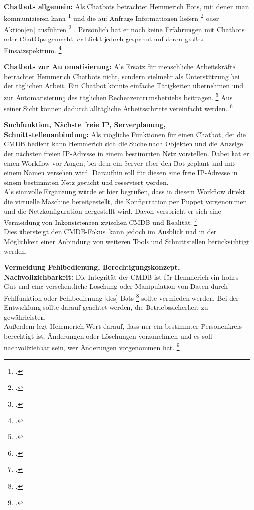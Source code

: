 \textbf{Chatbots allgemein: }Als Chatbots betrachtet Hemmerich Bots, \glqq{}mit denen man kommunizieren kann\grqq
\footcite[][o. \pno]{Hemm_2019}
und die auf Anfrage \glqq{}Informationen liefern\grqq
\footcite[][o. \pno]{Hemm_2019}
oder \glqq{}Aktion[en] ausführen\grqq
\footcite[][o. \pno]{Hemm_2019}
. Persönlich hat er noch keine Erfahrungen mit Chatbots oder ChatOps gemacht, er blickt jedoch gespannt auf deren großes Einsatzspektrum.
\footcite[Vgl.][o. \pno]{Hemm_2019}

\textbf{Chatbots zur Automatisierung: }Als Ersatz für menschliche Arbeitskräfte betrachtet Hemmerich Chatbots nicht, sondern vielmehr als Unterstützung bei der täglichen Arbeit. \glqq{}Ein Chatbot könnte einfache Tätigkeiten übernehmen und zur Automatisierung des täglichen Rechenzentrumsbetriebs beitragen.\grqq
\footcite[][o. \pno]{Hemm_2019}
Aus seiner Sicht können dadurch alltägliche Arbeitsschritte vereinfacht werden.
\footcite[Vgl.][o. \pno]{Hemm_2019}

\textbf{Suchfunktion, Nächste freie IP, Serverplanung, Schnittstellenanbindung: }Als mögliche Funktionen für einen Chatbot, der die \acs{CMDB} bedient kann Hemmerich sich die Suche nach Objekten und die Anzeige der nächsten freien IP-Adresse in einem bestimmten Netz vorstellen.
Dabei hat er einen Workflow vor Augen, bei dem ein Server über den Bot geplant und mit einem Namen versehen wird. Daraufhin soll für diesen eine freie IP-Adresse in einem bestimmten Netz gesucht und reserviert werden.\\
Als sinnvolle Ergänzung würde er hier begrüßen, dass in diesem Workflow direkt die virtuelle Maschine bereitgestellt, die Konfiguration per Puppet vorgenommen und die Netzkonfiguration hergestellt wird. Davon verspricht er sich eine Vermeidung von Inkonsistenzen zwischen CMDB und Realität. 
\footcite[Vgl.][o. \pno]{Hemm_2019}\\
Dies übersteigt den \acs{CMDB}-Fokus, kann jedoch im Ausblick und in der Möglichkeit einer Anbindung von weiteren Tools und Schnittstellen berücksichtigt werden.

\textbf{Vermeidung Fehlbedienung, Berechtigungskonzept, Nachvollziehbarkeit: }Die Integrität der \acs{CMDB} ist für Hemmerich ein hohes Gut und eine versehentliche Löschung oder Manipulation von Daten durch \glqq{}Fehlfunktion oder Fehlbedienung [des] Bots\grqq
\footcite[][o. \pno]{Hemm_2019}
sollte vermieden werden. Bei der Entwicklung sollte darauf geachtet werden, die Betriebssicherheit zu gewährleisten.\\
Außerdem legt Hemmerich Wert darauf, dass nur ein bestimmter Personenkreis berechtigt ist, Änderungen oder Löschungen vorzunehmen und es soll nachvollziehbar sein, wer Änderungen vorgenommen hat.
\footcite[Vgl.][o. \pno]{Hemm_2019}

